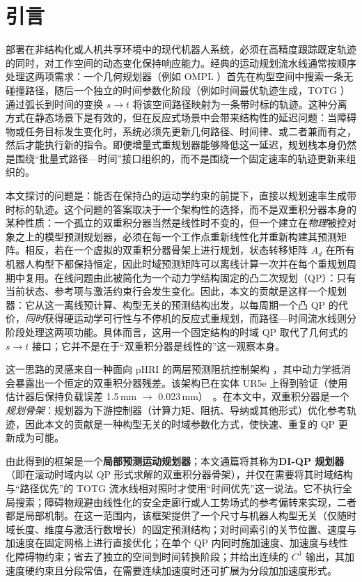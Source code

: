 \section{引言}\label{i.-introduction}

部署在非结构化或人机共享环境中的现代机器人系统，必须在高精度跟踪既定轨迹的同时，对工作空间的动态变化保持响应能力。经典的运动规划流水线通常按顺序处理这两项需求：一个几何规划器（例如 OMPL \cite{ompl}）首先在构型空间中搜索一条无碰撞路径，随后一个独立的时间参数化阶段（例如时间最优轨迹生成，TOTG \cite{pham2015}）通过弧长到时间的变换 \(s\rightarrow t\) 将该空间路径映射为一条带时标的轨迹。这种分离方式在静态场景下是有效的，但在反应式场景中会带来结构性的延迟问题：当障碍物或任务目标发生变化时，系统必须先更新几何路径、时间律、或二者兼而有之，然后才能执行新的指令。即便增量式重规划器能够降低这一延迟，规划栈本身仍然是围绕“批量式路径—时间”接口组织的，而不是围绕一个固定速率的轨迹更新来组织的。

本文探讨的问题是：能否在保持凸的运动学约束的前提下，直接以规划速率生成带时标的轨迹。这个问题的答案取决于一个架构性的选择，而不是双重积分器本身的某种性质：一个孤立的双重积分器当然是线性时不变的，但一个建立在\emph{物理}被控对象之上的模型预测规划器，必须在每一个工作点重新线性化并重新构建其预测矩阵。相反，若在一个虚拟的双重积分器骨架上进行规划，状态转移矩阵 \(A_d\) 在所有机器人构型下都保持恒定，因此时域预测矩阵可以离线计算一次并在每个重规划周期中复用。在线问题由此被简化为一个动力学结构固定的凸二次规划（QP）：只有当前状态、参考项与激活约束行会发生变化。因此，本文的贡献是这样一个规划器：它从这一离线预计算、构型无关的预测结构出发，以每周期一个凸 QP 的代价，\emph{同时}获得硬运动学可行性与不停机的反应式重规划，而路径—时间流水线则分阶段处理这两项功能。具体而言，这用一个固定结构的时域 QP 取代了几何式的 \(s\rightarrow t\) 接口；它并不是在于“双重积分器是线性的”这一观察本身。

这一思路的灵感来自一种面向 pHRI 的两层预测阻抗控制架构 \cite{phri}，其中动力学抵消会暴露出一个恒定的双重积分器残差。该架构已在实体 UR5e 上得到验证（使用估计器后保持负载误差 1.5\,mm $\to$ 0.023\,mm）~\cite{phri}。在本文中，双重积分器是一个\emph{规划骨架}：规划器为下游控制器（计算力矩、阻抗、导纳或其他形式）优化参考轨迹，因此本文的贡献是一种构型无关的时域参数化方式，使快速、重复的 QP 更新成为可能。

由此得到的框架是一个\textbf{局部预测运动规划器}；本文通篇将其称为\textbf{DI-QP 规划器}（即在滚动时域内以 QP 形式求解的双重积分器骨架），并仅在需要将其时域结构与“路径优先”的 TOTG 流水线相对照时才使用“时间优先”这一说法。它不执行全局搜索；障碍物规避由线性化的安全走廊行或人工势场式的参考偏转来实现，二者都是局部机制。在这一范围内，该框架提供了一个尺寸与机器人构型无关（仅随时域长度、维度与激活行数增长）的固定预测结构；对时间索引的关节位置、速度与加速度在固定网格上进行直接优化；在单个 QP 内同时施加速度、加速度与线性化障碍物约束；省去了独立的空间到时间转换阶段；并给出连续的 \(C^1\) 输出，其加速度硬约束且分段常值，在需要连续加速度时还可扩展为分段加加速度形式。


